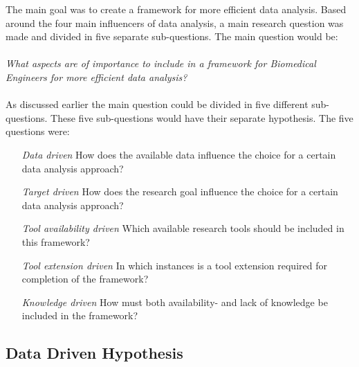 \documentclass[10pt,a4paper]{article}
\begin{document}
	The main goal was to create a framework for more efficient data analysis. Based around the four main influencers of data analysis, a main research question was made and divided in five separate sub-questions. The main question would be:\\
	\\
	\emph{What aspects are of importance to include in a framework for Biomedical Engineers for more efficient data analysis?}\\
	\\
	As discussed earlier the main question could be divided in five different sub-questions. These five sub-questions would have their separate hypothesis. The five questions were:
	
	\begin{enumerate}

	\item[\textit{Data driven}] How does the available data influence the choice for a certain data analysis approach?
	
	\item[\textit{Target driven}] How does the research goal influence the choice for a certain data analysis approach?
	
	\item[\textit{Tool availability driven}] Which available research tools should be included in this framework?
	
	\item[\textit{Tool extension driven}] In which instances is a tool extension required for completion of the framework?
	
	\item[\textit{Knowledge driven}] How must both availability- and lack of knowledge be included in the framework?
	
	\end{enumerate}
	
	\subsection{Data Driven Hypothesis}
	\label{subsec:DataDrivenHypothesis}
	
\end{document}
